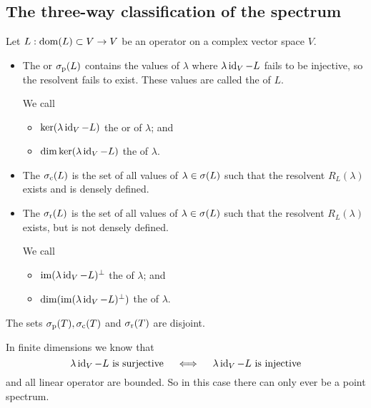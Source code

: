 \subsection{The three-way classification of the spectrum}
\begin{definition}
Let $L: \operatorname{dom}(L)\subset V \to V$ be an operator on a complex vector space $V$.

\begin{itemize}
\item The  or  $\sigma_\text{p}(L)$ contains the values of $\lambda$ where $\lambda \operatorname{id}_V - L$ fails to be injective, so the resolvent fails to exist. These values are called the  of $L$.

We call
\begin{itemize}
\item $\ker(\lambda \operatorname{id}_V - L)$ the  or  of $\lambda$; and
\item $\dim\ker(\lambda \operatorname{id}_V - L)$ the  of $\lambda$.
\end{itemize}
\item The  $\sigma_\text{c}(L)$ is the set of all values of $\lambda\in\sigma(L)$ such that the resolvent $R_L(\lambda)$ exists and is densely defined.
\item The  $\sigma_\text{r}(L)$ is the set of all values of $\lambda\in\sigma(L)$ such that the resolvent $R_L(\lambda)$ exists, but is not densely defined.

We call
\begin{itemize}
\item $\operatorname{im}(\lambda \operatorname{id}_V - L)^\perp$ the  of $\lambda$; and 
\item $\dim(\operatorname{im}(\lambda \operatorname{id}_V - L)^\perp)$ the  of $\lambda$.
\end{itemize}
\end{itemize}
The sets $\sigma_\text{p}(T), \sigma_\text{c}(T)$ and $\sigma_\text{r}(T)$ are disjoint.
\end{definition}
In finite dimensions we know that
\[ \text{$\lambda \operatorname{id}_V - L$ is surjective} \quad\iff\quad \text{$\lambda \operatorname{id}_V - L$ is injective} \]
and all linear operator are bounded.
So in this case there can only ever be a point spectrum.

